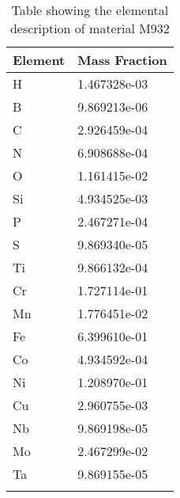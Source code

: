 \begin{centering}
\begin{longtable}[ht!]
\caption{Table showing the elemental description of material M921}
\label{table:material_EMH}
\end{longtable}
\clearpage

\begin{longtable}[ht!]
{ p{} | p{} }
\hline
Element & Mass Fraction\\
\hline
H &  1.467328e-03\\
B &  9.869213e-06\\
C &  2.926459e-04\\
N &  6.908688e-04\\
O &  1.161415e-02\\
Si &  4.934525e-03\\
P &  2.467271e-04\\
S &  9.869340e-05\\
Ti &  9.866132e-04\\
Cr &  1.727114e-01\\
Mn &  1.776451e-02\\
Fe &  6.399610e-01\\
Co &  4.934592e-04\\
Ni &  1.208970e-01\\
Cu &  2.960755e-03\\
Nb &  9.869198e-05\\
Mo &  2.467299e-02\\
Ta &  9.869155e-05\\

\caption{Table showing the elemental description of material M932}
\label{table:material_UPDFW3}
\end{longtable}
\clearpage


\end{centering}
